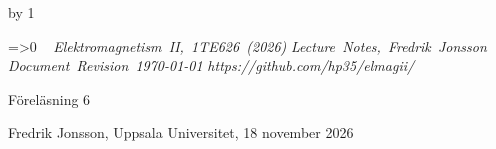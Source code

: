 {{{{\cleardoublepage
%
%
%
%
%
%
%
\def\coursename{Elektromagnetism II}
\def\coursecode{1TE626}
\def\courseyear{2026}
\def\courserepo{https://github.com/hp35/elmagii/}
\def\lecturenumber{6}
\def\lecturetitle{Elektriska f\"alt i material}
\def\lecturesubtitle{}
\def\lectureauthor{Fredrik Jonsson}
\def\lectureplace{Uppsala Universitet}
\def\lecturedate{18 november 2026}
\edef\expandedlecturenumber{6}
\def\ifempty#1{\ifx\relax#1\relax}
\advance\chapno by 1
\immediate{}
\hsize=150mm\hoffset=4.6mm\vsize=230mm\voffset=7mm
\topskip=0pt\baselineskip=12pt\parskip=0pt\leftskip=0pt\parindent=15pt
\ifcolors
  \voffset=-10.2mm\topskip=0pt
\fi
\headline={\ifnum\secno>0\ifodd\pageno\rightheadline\else\leftheadline\fi
  \else\hfill\fi}
\def\rightheadline{\tenrm{\it F\"orel\"asning 6}
  \hfil{\it \coursename, \coursecode\ (\courseyear)}}
\def\leftheadline{\tenrm{\it \coursename, \coursecode\ (\courseyear)}
  \hfil{\it F\"orel\"asning 6}}
\noindent~\vskip-60pt\hskip-40pt{}
\vskip-42pt\hfill\vbox{
    \hbox{{\it \coursename, \coursecode\ (\courseyear)}}
    \hbox{{\it Lecture Notes, \lectureauthor}}
    \hbox{{\it Document Revision \today}}
    \hbox{{\it \courserepo}}}\vskip 36pt
\centerline{\twelvesc F\"orel\"asning 6}
\vskip 24pt\noindent
\centerline{}
\expandafter\ifempty\expandafter{\lecturesubtitle}%
  \else\centerline{\twelvesc\lecturesubtitle}\fi
\bigskip
\centerline{\lectureauthor, \lectureplace, \lecturedate}
\vskip24pt



}}}}
